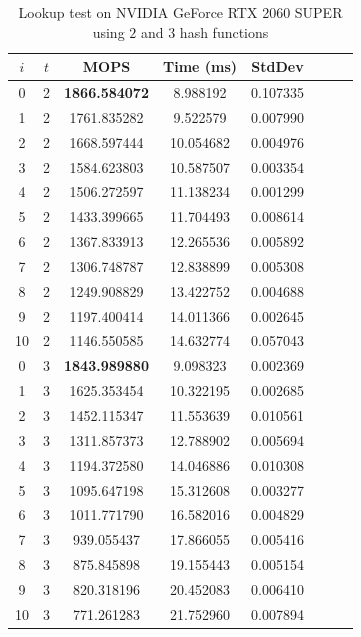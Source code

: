 \documentclass[10pt,twocolumn,letterpaper]{article}
\begin{document}
\begin{table}[h]
    \centering
   \begin{tabular}{@{}c|ccccccc@{}}
\toprule
$i$ & $t$ & MOPS    & Time (ms)& StdDev  \\ \midrule
0 & 2 & \textbf{1866.584072} & 8.988192 & 0.107335 \\
1 & 2 & 1761.835282 & 9.522579 & 0.007990 \\
2 & 2 & 1668.597444 & 10.054682 & 0.004976 \\
3 & 2 & 1584.623803 & 10.587507 & 0.003354 \\
4 & 2 & 1506.272597 & 11.138234 & 0.001299 \\
5 & 2 & 1433.399665 & 11.704493 & 0.008614 \\
6 & 2 & 1367.833913 & 12.265536 & 0.005892 \\
7 & 2 & 1306.748787 & 12.838899 & 0.005308 \\
8 & 2 & 1249.908829 & 13.422752 & 0.004688 \\
9 & 2 & 1197.400414 & 14.011366 & 0.002645 \\
10 & 2 & 1146.550585 & 14.632774 & 0.057043 \\
0 & 3 & \textbf{1843.989880} & 9.098323 & 0.002369 \\
1 & 3 & 1625.353454 & 10.322195 & 0.002685 \\
2 & 3 & 1452.115347 & 11.553639 & 0.010561 \\
3 & 3 & 1311.857373 & 12.788902 & 0.005694 \\
4 & 3 & 1194.372580 & 14.046886 & 0.010308 \\
5 & 3 & 1095.647198 & 15.312608 & 0.003277 \\
6 & 3 & 1011.771790 & 16.582016 & 0.004829 \\
7 & 3 & 939.055437 & 17.866055 & 0.005416 \\
8 & 3 & 875.845898 & 19.155443 & 0.005154 \\
9 & 3 & 820.318196 & 20.452083 & 0.006410 \\
10 & 3 & 771.261283 & 21.752960 & 0.007894 \\
\bottomrule
\end{tabular}
    \caption{Lookup test on NVIDIA GeForce RTX 2060 SUPER using $2$ and $3$ hash functions}
    \label{tab:lookup_2060}
\end{table}
\end{document}
